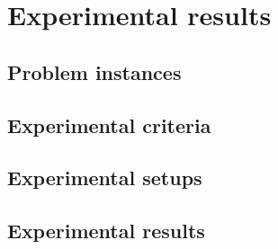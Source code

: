 \chapter{Experimental results}
\label{chap:chap4}

\section{Problem instances}
\label{experiment:dataset}


\section{Experimental criteria}
\label{experiment:criteria}


\section{Experimental setups}
\label{experiment:setup}


\section{Experimental results}
\label{experiment:result}


